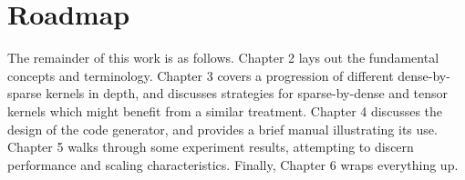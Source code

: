 \section{Roadmap} 
  The remainder of this work is as follows. Chapter 2 lays out the fundamental concepts and terminology. Chapter 3 covers a progression of different dense-by-sparse kernels in depth, and discusses strategies for sparse-by-dense and tensor kernels which might benefit from a similar treatment. Chapter 4 discusses the design of the code generator, and provides a brief manual illustrating its use. Chapter 5 walks through some experiment results, attempting to discern performance and scaling characteristics. Finally, Chapter 6 wraps everything up.










